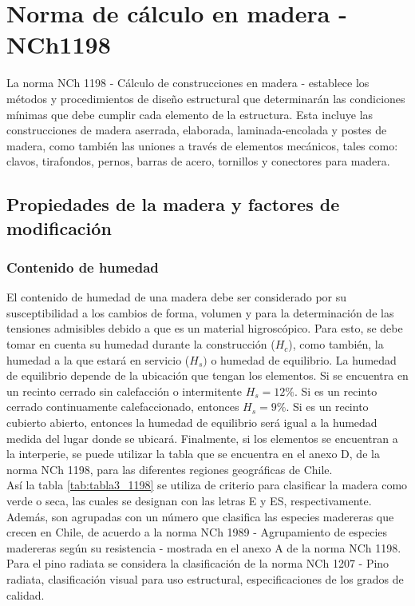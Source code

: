 %
\chapter{Norma de cálculo en madera - NCh1198}
\label{ch:anexo_a}

La norma NCh 1198 - Cálculo de construcciones en madera - establece los métodos y procedimientos de diseño estructural que determinarán las condiciones mínimas que debe cumplir cada elemento de la estructura. Esta incluye las construcciones de madera aserrada, elaborada, laminada-encolada y postes de madera, como también las uniones a través de elementos mecánicos, tales como: clavos, tirafondos, pernos, barras de acero, tornillos y conectores para madera.

\section{Propiedades de la madera y factores de modificación}
\subsection{Contenido de humedad}
\label{sec:contenido_humedad}

El contenido de humedad de una madera debe ser considerado por su susceptibilidad a los cambios de forma, volumen y para la determinación de las tensiones admisibles debido a que es un material higroscópico. Para esto, se debe tomar en cuenta su humedad durante la construcción ($H_c$), como también, la humedad a la que estará en servicio ($H_s)$ o humedad de equilibrio. La humedad de equilibrio depende de la ubicación que tengan los elementos. Si se encuentra en un recinto cerrado sin calefacción o intermitente $H_s= 12\%$. Si es un recinto cerrado continuamente calefaccionado, entonces $H_s=9\%$. Si es un recinto cubierto abierto, entonces la humedad de equilibrio será igual a la humedad medida del lugar donde se ubicará. Finalmente, si los elementos se encuentran a la interperie, se puede utilizar la tabla que se encuentra en el anexo D, de la norma NCh 1198, para las diferentes regiones geográficas de Chile.\\

Así la tabla \ref{tab:tabla3_1198} se utiliza de criterio para clasificar la madera como verde o seca, las cuales se designan con las letras E y ES, respectivamente. Además, son agrupadas con un número que clasifica las especies madereras que crecen en Chile, de acuerdo a la norma NCh 1989 - Agrupamiento de especies madereras según su resistencia - mostrada en el anexo A de la norma NCh 1198. Para el pino radiata se considera la clasificación de la norma NCh 1207 - Pino radiata, clasificación visual para uso estructural, especificaciones de los grados de calidad.

